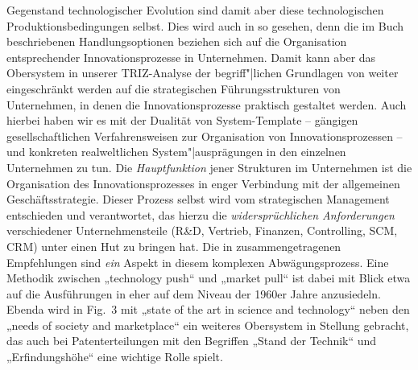 \documentclass[12pt,a4paper]{article}
\begin{document}
Gegenstand technologischer Evolution sind damit aber diese technologischen
Produktionsbedingungen selbst. Dies wird auch in \cite{TESE2018} so gesehen,
denn die im Buch beschriebenen Handlungsoptionen beziehen sich auf die
Organisation entsprechender Innovationsprozesse in Unternehmen. Damit kann
aber das Obersystem in unserer TRIZ-Analyse der begriff"|lichen Grundlagen von
\cite{TESE2018} weiter eingeschränkt werden auf die strategischen
Führungsstrukturen von Unternehmen, in denen die Innovationsprozesse praktisch
gestaltet werden. Auch hierbei haben wir es mit der Dualität von
System-Template -- gängigen gesellschaftlichen Verfahrensweisen zur
Organisation von Innovationsprozessen -- und konkreten realweltlichen
System"|ausprägungen in den einzelnen Unternehmen zu tun. Die
\emph{Hauptfunktion} jener Strukturen im Unternehmen ist die Organisation des
Innovationsprozesses in enger Verbindung mit der allgemeinen
Geschäftsstrategie.  Dieser Prozess selbst wird vom strategischen Management
entschieden und verantwortet, das hierzu die \emph{widersprüchlichen
  Anforderungen} verschiedener Unternehmensteile (R\&D, Vertrieb, Finanzen,
Controlling, SCM, CRM) unter einen Hut zu bringen hat. Die in \cite{TESE2018}
zusammengetragenen Empfehlungen sind \emph{ein} Aspekt in diesem komplexen
Abwägungsprozess. Eine Methodik zwischen „technology push“ und „market pull“
ist dabei mit Blick etwa auf die Ausführungen in \cite{Preez2006} eher auf dem
Niveau der 1960er Jahre anzusiedeln. Ebenda wird in Fig.~3 mit „state of the
art in science and technology“ neben den „needs of society and marketplace“
ein weiteres Obersystem in Stellung gebracht, das auch bei Patenterteilungen
mit den Begriffen „Stand der Technik“ und „Erfindungshöhe“ eine wichtige Rolle
spielt.
\end{document}
